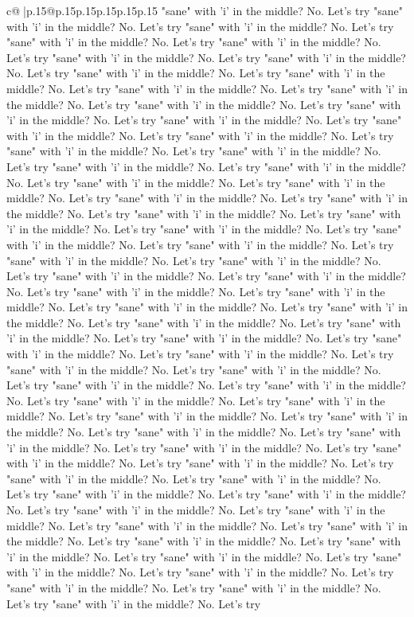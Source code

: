 \documentclass{article}
\begin{document}
{\begin{supertabular}{c@{$\;$}|p{.15\linewidth}@{}p{.15\linewidth}p{.15\linewidth}p{.15\linewidth}p{.15\linewidth}p{.15\linewidth}}
{{{"sane" with 'i' in the middle? No. Let's try "sane" with 'i' in the middle? No. Let's try "sane" with 'i' in the middle? No. Let's try "sane" with 'i' in the middle? No. Let's try "sane" with 'i' in the middle? No. Let's try "sane" with 'i' in the middle? No. Let's try "sane" with 'i' in the middle? No. Let's try "sane" with 'i' in the middle? No. Let's try "sane" with 'i' in the middle? No. Let's try "sane" with 'i' in the middle? No. Let's try "sane" with 'i' in the middle? No. Let's try "sane" with 'i' in the middle? No. Let's try "sane" with 'i' in the middle? No. Let's try "sane" with 'i' in the middle? No. Let's try "sane" with 'i' in the middle? No. Let's try "sane" with 'i' in the middle? No. Let's try "sane" with 'i' in the middle? No. Let's try "sane" with 'i' in the middle? No. Let's try "sane" with 'i' in the middle? No. Let's try "sane" with 'i' in the middle? No. Let's try "sane" with 'i' in the middle? No. Let's try "sane" with 'i' in the middle? No. Let's try "sane" with 'i' in the middle? No. Let's try "sane" with 'i' in the middle? No. Let's try "sane" with 'i' in the middle? No. Let's try "sane" with 'i' in the middle? No. Let's try "sane" with 'i' in the middle? No. Let's try "sane" with 'i' in the middle? No. Let's try "sane" with 'i' in the middle? No. Let's try "sane" with 'i' in the middle? No. Let's try "sane" with 'i' in the middle? No. Let's try "sane" with 'i' in the middle? No. Let's try "sane" with 'i' in the middle? No. Let's try "sane" with 'i' in the middle? No. Let's try "sane" with 'i' in the middle? No. Let's try "sane" with 'i' in the middle? No. Let's try "sane" with 'i' in the middle? No. Let's try "sane" with 'i' in the middle? No. Let's try "sane" with 'i' in the middle? No. Let's try "sane" with 'i' in the middle? No. Let's try "sane" with 'i' in the middle? No. Let's try "sane" with 'i' in the middle? No. Let's try "sane" with 'i' in the middle? No. Let's try "sane" with 'i' in the middle? No. Let's try "sane" with 'i' in the middle? No. Let's try "sane" with 'i' in the middle? No. Let's try "sane" with 'i' in the middle? No. Let's try "sane" with 'i' in the middle? No. Let's try "sane" with 'i' in the middle? No. Let's try "sane" with 'i' in the middle? No. Let's try "sane" with 'i' in the middle? No. Let's try "sane" with 'i' in the middle? No. Let's try "sane" with 'i' in the middle? No. Let's try "sane" with 'i' in the middle? No. Let's try "sane" with 'i' in the middle? No. Let's try "sane" with 'i' in the middle? No. Let's try "sane" with 'i' in the middle? No. Let's try "sane" with 'i' in the middle? No. Let's try "sane" with 'i' in the middle? No. Let's try "sane" with 'i' in the middle? No. Let's try "sane" with 'i' in the middle? No. Let's try "sane" with 'i' in the middle? No. Let's try "sane" with 'i' in the middle? No. Let's try "sane" with 'i' in the middle? No. Let's try "sane" with 'i' in the middle? No. Let's try "sane" with 'i' in the middle? No. Let's try "sane" with 'i' in the middle? No. Let's try "sane" with 'i' in the middle? No. Let's try "sane" with 'i' in the middle? No. Let's try "sane" with 'i' in the middle? No. Let's try "sane" with 'i' in the middle? No. Let's try }}}
\end{supertabular}}
\end{document}
